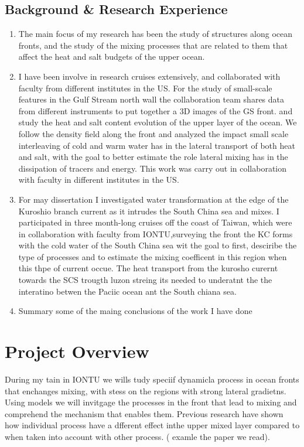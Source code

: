 \documentclass[letterpaper, 12pt ]{article}
\begin{document}
\subsection*{Background \&  Research Experience}
\begin{enumerate}
    \item The main focus of my research has been the study of structures along ocean fronts, and the study of the mixing processes that are related to them that affect the heat and salt budgets of the upper ocean. 
    
    
    \item I have been involve in research cruises extensively, and collaborated with faculty from different institutes in the US. For the study of small-scale features in the Gulf Stream north wall the collaboration team shares data from different instruments to put together a 3D images of the GS front.  and study the heat and salt content evolution of the upper layer of the ocean. We follow the density field along the front and analyzed the impact small scale interleaving of cold and warm water has in the lateral transport of both heat and salt, with the goal to better estimate the role lateral mixing has in the dissipation of tracers and energy. This work was carry out in collaboration with faculty in different institutes in the US. 
    
    \item For may dissertation I investigated  water transformation at the edge of the Kuroshio branch current as it intrudes the South China sea and mixes. I participated in three month-long cruises off the coast of Taiwan, which were in collaboration with faculty from IONTU,surveying the front the KC forms with the cold water of the South China sea  wit the goal to first, desciribe the type of processes and to estimate the mixing coefficent in this region when this thpe of current occue. The heat transport from the kurosho curernt towards the SCS trougth luzon streing its needed to underatnt the the interatino betwen the Paciic ocean ant the South chiana sea. 
    
    \item Summary some of the maing conclusions of the work I have done
\end{enumerate}


\section*{Project Overview}
During my tain in IONTU we wills tudy speciif dynamicla process in ocean fronts that enchanges mixing, with stess on the regions with strong lateral gradietns. Using models we will invitgage the processes in the front that lead to mixing and comprehend the mechanism that enables them. Previous research have shown how individual process have a dfferent effect inthe upper mixed layer compared to when taken into account with other process. ( examle the paper we read). 
\end{document}

